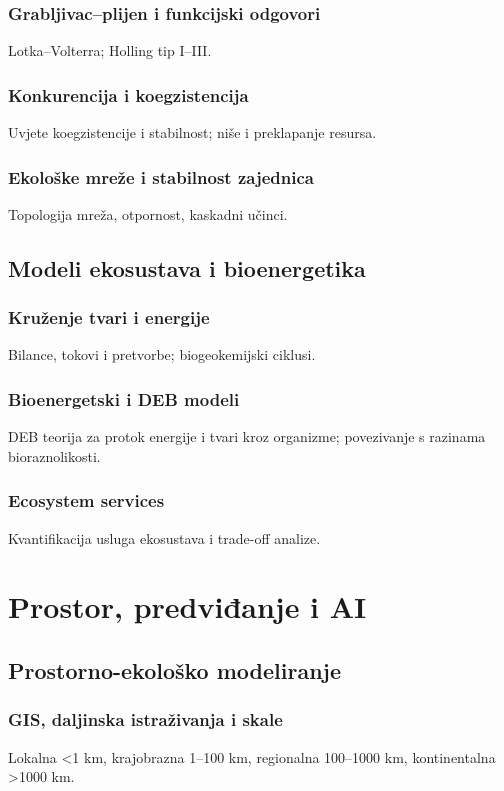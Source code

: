 \documentclass[12pt,oneside]{book}
\begin{document}
	\section{Grabljivac--plijen i funkcijski odgovori}
	Lotka--Volterra; Holling tip I--III.
	\section{Konkurencija i koegzistencija}
	Uvjete koegzistencije i stabilnost; niše i preklapanje resursa.
	\section{Ekološke mreže i stabilnost zajednica}
	Topologija mreža, otpornost, kaskadni učinci.
	
	\chapter{Modeli ekosustava i bioenergetika}
	\section{Kruženje tvari i energije}
	Bilance, tokovi i pretvorbe; biogeokemijski ciklusi.
	\section{Bioenergetski i DEB modeli}
	DEB teorija za protok energije i tvari kroz organizme; povezivanje s razinama bioraznolikosti.
	\section{Ecosystem services}
	Kvantifikacija usluga ekosustava i trade-off analize.
	
	\part{Prostor, predviđanje i AI}
	
	\chapter{Prostorno-ekološko modeliranje}
	\section{GIS, daljinska istraživanja i skale}
	Lokalna \textless{}1 km, krajobrazna 1--100 km, regionalna 100--1000 km, kontinentalna \textgreater{}1000 km.
\end{document}
